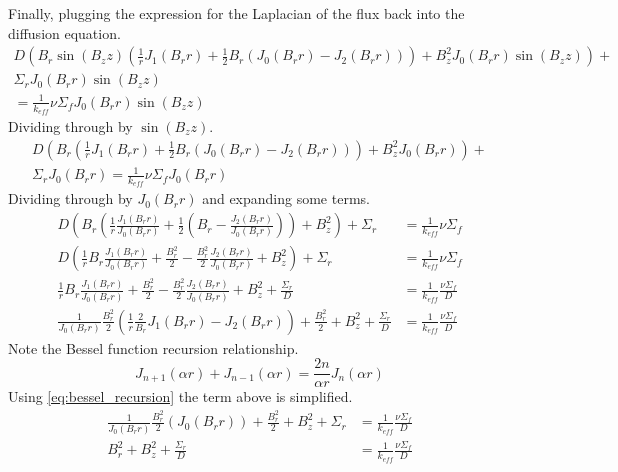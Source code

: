 \documentclass{article}
\begin{document}
  Finally, plugging the expression for the Laplacian of the flux back into the
  diffusion equation.
  \begin{multline}
    D \left( B_r \sin(B_z z) \left( \frac{1}{r} J_1(B_r r) + \frac{1}{2} B_r
    \left( J_0(B_r r) - J_2(B_r r) \right) \right) + B_z^2 J_0(B_r r) \sin(B_z
    z) \right) + \\
    \Sigma_r J_0(B_r r) \sin(B_z z) \\
    = \frac{1}{k_{eff}} \nu
    \Sigma_f J_0(B_r r) \sin(B_z z)
  \end{multline}
  Dividing through by $\sin(B_z z)$.
  \begin{multline}
    D \left( B_r \left( \frac{1}{r} J_1(B_r r) + \frac{1}{2} B_r
    \left( J_0(B_r r) - J_2(B_r r) \right) \right) + B_z^2 J_0(B_r r) \right)+\\
    \Sigma_r J_0(B_r r) = \frac{1}{k_{eff}} \nu \Sigma_f J_0(B_r r) 
  \end{multline}
  Dividing through by $J_0(B_r r)$ and expanding some terms.
  \begin{align}
    D \left( B_r \left( \frac{1}{r} \frac{J_1(B_r r)}{J_0(B_r r)} + 
      \frac{1}{2} \left(B_r - \frac{J_2(B_r r)}{J_0(B_r r)} \right) \right) 
      + B_z^2 \right)+ \Sigma_r &= \frac{1}{k_{eff}} \nu \Sigma_f \\
    D \left( \frac{1}{r} B_r \frac{J_1(B_r r)}{J_0(B_r r)} + \frac{B_r^2}{2} -
      \frac{B_r^2}{2} \frac{J_2(B_r r)}{J_0(B_r r)} + B_z^2 \right) + \Sigma_r&=
      \frac{1}{k_{eff}} \nu \Sigma_f  \\
    \frac{1}{r} B_r \frac{J_1(B_r r)}{J_0(B_r r)} + \frac{B_r^2}{2} -
      \frac{B_r^2}{2} \frac{J_2(B_r r)}{J_0(B_r r)} + B_z^2 + 
      \frac{\Sigma_r}{D} &= \frac{1}{k_{eff}} \frac{\nu \Sigma_f}{D}\\
    \frac{1}{J_0(B_r r)} \frac{B_r^2}{2} \left(\frac{1}{r} \frac{2}{B_r} 
      J_1(B_r r) - J_2(B_r r) \right) + \frac{B_r^2}{2} + B_z^2 + 
      \frac{\Sigma_r}{D} &= \frac{1}{k_{eff}} \frac{\nu \Sigma_f}{D}
  \end{align}
  Note the Bessel function recursion relationship.
  \begin{equation} \label{eq:bessel_recursion}
    J_{n+1}(\alpha r) + J_{n-1}(\alpha r) = \frac{2n}{\alpha r} J_n(\alpha r)
  \end{equation}
  Using \eqref{eq:bessel_recursion} the term above is simplified.
  \begin{align}
    \frac{1}{J_0(B_r r)} \frac{B_r^2}{2} \left( J_0(B_r r) \right) + 
      \frac{B_r^2}{2} + B_z^2 + \Sigma_r &= \frac{1}{k_{eff}} 
      \frac{\nu \Sigma_f}{D} \\
    B_r^2 + B_z^2 + \frac{\Sigma_r}{D} &= \frac{1}{k_{eff}} \frac{\nu \Sigma_f}
      {D}
  \end{align}
\end{document}
